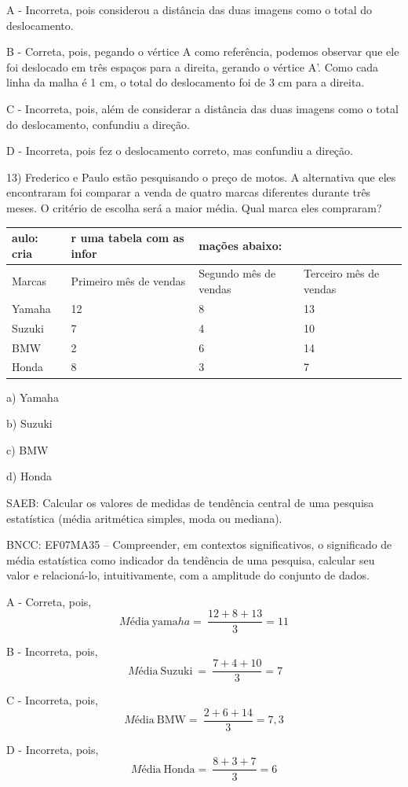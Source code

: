 A - Incorreta, pois considerou a distância das duas imagens como o total
do deslocamento.

B - Correta, pois, pegando o vértice A como referência, podemos observar
que ele foi deslocado em três espaços para a direita, gerando o vértice
A'. Como cada linha da malha é 1 cm, o total do deslocamento foi de 3 cm
para a direita.

C - Incorreta, pois, além de considerar a distância das duas imagens
como o total do deslocamento, confundiu a direção.

D - Incorreta, pois fez o deslocamento correto, mas confundiu a direção.

13) Frederico e Paulo estão pesquisando o preço de motos. A alternativa
que eles encontraram foi comparar a venda de quatro marcas diferentes
durante três meses. O critério de escolha será a maior média. Qual marca
eles compraram?

\begin{longtable}[]{@{}llll@{}}
\toprule
aulo: cria & r uma tabela com as infor & mações abaixo: &\tabularnewline
\midrule
\endhead
Marcas~ & Primeiro mês de vendas & Segundo mês de vendas & Terceiro mês
de vendas\tabularnewline
Yamaha & 12 & 8 & 13\tabularnewline
Suzuki & 7 & 4 & 10\tabularnewline
BMW & 2 & 6 & 14\tabularnewline
Honda & 8 & 3 & 7\tabularnewline
\bottomrule
\end{longtable}

a) Yamaha

b) Suzuki

c) BMW

d) Honda

SAEB: Calcular os valores de medidas de tendência central de uma
pesquisa estatística (média aritmética simples, moda ou mediana).

BNCC: EF07MA35 -- Compreender, em contextos significativos, o
significado de média estatística como indicador da tendência de uma
pesquisa, calcular seu valor e relacioná-lo, intuitivamente, com a
amplitude do conjunto de dados.

A - Correta, pois,
\[Mé\text{dia}\ \text{yama}ha = \ \frac{12 + 8 + 13}{3} = 11\]

B - Incorreta, pois,
\[\ Mé\text{dia}\ \text{Suzuki}\  = \ \frac{7 + 4 + 10}{3} = 7\]

C - Incorreta, pois,
\[Mé\text{dia}\ \text{BMW} = \ \frac{2 + 6 + 14}{3} = 7,3\]

D - Incorreta, pois,
\[Mé\text{dia}\ \text{Honda} = \ \frac{8 + 3 + 7}{3} = 6\]

